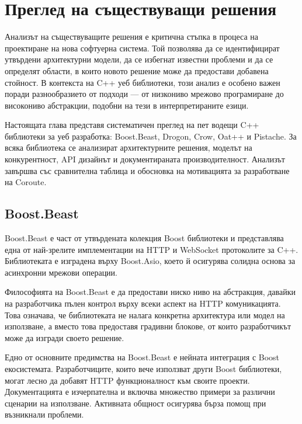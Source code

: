 \section{Преглед на съществуващи решения}
\label{sec:existing_solutions}

Анализът на съществуващите решения е критична стъпка в процеса на проектиране на нова софтуерна система. Той позволява да се идентифицират утвърдени архитектурни модели, да се избегнат известни проблеми и да се определят области, в които новото решение може да предостави добавена стойност. В контекста на C++ уеб библиотеки, този анализ е особено важен поради разнообразието от подходи --- от низкониво мрежово програмиране до високониво абстракции, подобни на тези в интерпретираните езици.

Настоящата глава представя систематичен преглед на пет водещи C++ библиотеки за уеб разработка: Boost.Beast, Drogon, Crow, Oat++ и Pistache. За всяка библиотека се анализират архитектурните решения, моделът на конкурентност, API дизайнът и документираната производителност. Анализът завършва със сравнителна таблица и обосновка на мотивацията за разработване на Coroute.

\subsection{Boost.Beast}

Boost.Beast \cite{boost_beast} е част от утвърдената колекция Boost библиотеки и представлява една от най-зрелите имплементации на HTTP и WebSocket протоколите за C++. Библиотеката е изградена върху Boost.Asio, което й осигурява солидна основа за асинхронни мрежови операции.

Философията на Boost.Beast е да предостави ниско ниво на абстракция, давайки на разработчика пълен контрол върху всеки аспект на HTTP комуникацията. Това означава, че библиотеката не налага конкретна архитектура или модел на използване, а вместо това предоставя градивни блокове, от които разработчикът може да изгради своето решение.

Едно от основните предимства на Boost.Beast е нейната интеграция с Boost екосистемата. Разработчиците, които вече използват други Boost библиотеки, могат лесно да добавят HTTP функционалност към своите проекти. Документацията е изчерпателна и включва множество примери за различни сценарии на използване. Активната общност осигурява бърза помощ при възникнали проблеми.

